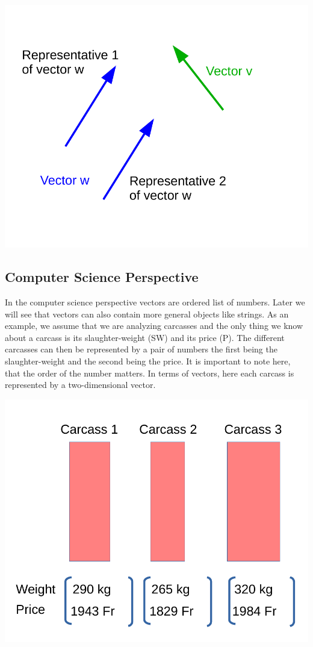 \documentclass[
]{book}
\theoremstyle{definition}
\theoremstyle{definition}
\theoremstyle{definition}
\theoremstyle{remark}
\begin{document}
\includegraphics[width=12.22in,]{odg/vector-physics-perspective}

\hypertarget{intro-linalg-computer-science-perspective}{%
\subsection{Computer Science Perspective}\label{intro-linalg-computer-science-perspective}}

In the computer science perspective vectors are ordered list of numbers. Later we will see that vectors can also contain more general objects like strings. As an example, we assume that we are analyzing carcasses and the only thing we know about a carcass is its slaughter-weight (SW) and its price (P). The different carcasses can then be represented by a pair of numbers the first being the slaughter-weight and the second being the price. It is important to note here, that the order of the number matters. In terms of vectors, here each carcass is represented by a two-dimensional vector.

\includegraphics[width=7.54in,]{odg/vector-cs-perspecitve}
\end{document}
